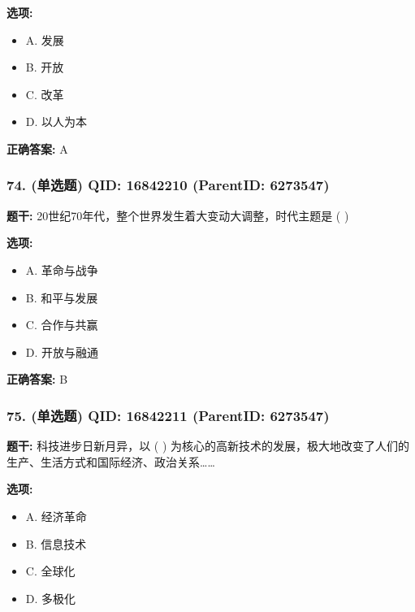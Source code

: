 \documentclass[12pt,UTF8]{ctexart}
\begin{document}
\textbf{选项:}
\begin{itemize}[leftmargin=*]

  \item A. 发展

  \item B. 开放

  \item C. 改革

  \item D. 以人为本

\end{itemize}

\textbf{正确答案:}
A

\vspace{0.3em}\hrulefill\vspace{0.7em}

\subsubsection*{74. (单选题) \small QID: 16842210 (ParentID: 6273547)}

\textbf{题干:}
20世纪70年代，整个世界发生着大变动大调整，时代主题是 ( )



\textbf{选项:}
\begin{itemize}[leftmargin=*]

  \item A. 革命与战争

  \item B. 和平与发展

  \item C. 合作与共赢

  \item D. 开放与融通

\end{itemize}

\textbf{正确答案:}
B

\vspace{0.3em}\hrulefill\vspace{0.7em}

\subsubsection*{75. (单选题) \small QID: 16842211 (ParentID: 6273547)}

\textbf{题干:}
科技进步日新月异，以 ( ) 为核心的高新技术的发展，极大地改变了人们的生产、生活方式和国际经济、政治关系……



\textbf{选项:}
\begin{itemize}[leftmargin=*]

  \item A. 经济革命

  \item B. 信息技术

  \item C. 全球化

  \item D. 多极化

\end{itemize}
\end{document}
